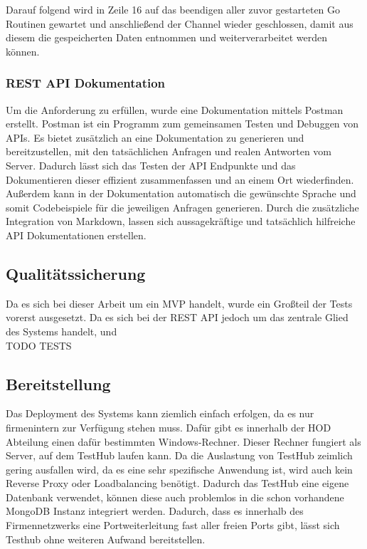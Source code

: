 Darauf folgend wird in Zeile 16 auf das beendigen aller zuvor gestarteten Go 
Routinen gewartet und anschließend der Channel wieder geschlossen, damit aus diesem
die gespeicherten Daten entnommen und weiterverarbeitet werden können.

\subsubsection{REST API Dokumentation}
Um die Anforderung  zu erfüllen, wurde eine Dokumentation
mittels Postman erstellt. Postman ist ein Programm
zum gemeinsamen Testen und Debuggen von APIs. Es bietet zusätzlich an eine Dokumentation
zu generieren und bereitzustellen, mit den tatsächlichen Anfragen und realen Antworten
vom Server. Dadurch lässt sich das Testen der API Endpunkte und das Dokumentieren
dieser effizient zusammenfassen und an einem Ort wiederfinden. Außerdem kann in der
Dokumentation automatisch die gewünschte Sprache und somit Codebeispiele für die
jeweiligen Anfragen generieren. Durch die zusätzliche Integration von Markdown, 
lassen sich aussagekräftige und tatsächlich hilfreiche API Dokumentationen erstellen.

\subsection{Qualitätssicherung}
Da es sich bei dieser Arbeit um ein \gls{MVP} handelt, wurde ein Großteil der Tests
vorerst ausgesetzt. Da es sich bei der \gls{REST} \gls{API} jedoch um das zentrale
Glied des Systems handelt, und \\

TODO TESTS

\subsection{Bereitstellung}
Das Deployment des Systems kann ziemlich einfach erfolgen, da es nur firmenintern
zur Verfügung stehen muss. Dafür gibt es innerhalb der \gls{HOD} Abteilung einen
dafür bestimmten Windows-Rechner. Dieser Rechner fungiert als Server, auf dem TestHub
laufen kann. Da die Auslastung von TestHub zeimlich gering ausfallen wird, da es 
eine sehr spezifische Anwendung ist, wird auch kein Reverse Proxy oder Loadbalancing
benötigt. Dadurch das TestHub eine eigene Datenbank verwendet, können diese auch problemlos in 
die schon vorhandene MongoDB Instanz integriert werden. Dadurch, dass es innerhalb 
des Firmennetzwerks eine Portweiterleitung fast aller freien Ports gibt, lässt sich Testhub
ohne weiteren Aufwand bereitstellen.